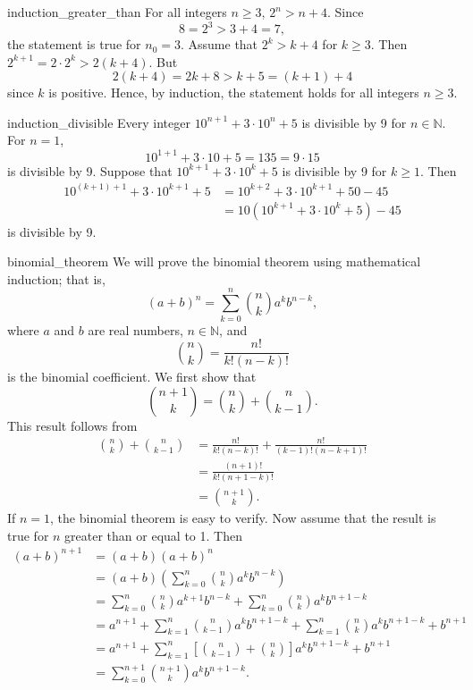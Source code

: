 
\begin{example}{induction_greater_than}
For all integers $n \geq 3$, $2^n > n + 4$. Since
\[
8 = 2^3 > 3 + 4 = 7,
\]
the statement is true for $n_0 = 3$.  Assume that $2^k > k + 4$ for $k \geq 3$.  Then $2^{k + 1} = 2 \cdot 2^{k} > 2(k + 4)$.  But 
\[
2(k + 4) = 2k + 8 > k + 5 = (k + 1) + 4
\]
since $k$ is positive.  Hence, by induction, the statement holds for all integers $n \geq 3$. 
\end{example}

\begin{example}{induction_divisible}
Every integer $10^{n + 1} + 3 \cdot 10^n + 5$ is divisible by 9 for $n \in {\mathbb N}$.  For $n = 1$, 
\[
10^{1 + 1} + 3 \cdot 10 + 5 = 135 = 9 \cdot 15
\]
is divisible by 9.  Suppose that $10^{k + 1} + 3 \cdot 10^k + 5$ is divisible by 9 for $k \geq 1$.  Then 
\begin{align*}
10^{(k + 1) + 1} + 3 \cdot 10^{k + 1} + 5
& =
10^{k + 2} + 3 \cdot 10^{k + 1} + 50 - 45 \\
& =
10 (10^{k + 1} + 3 \cdot 10^{k} + 5) - 45
\end{align*}
is divisible by 9.
\end{example}

\begin{example}{binomial_theorem}
We will prove the binomial theorem using mathematical induction; that is, 
\[
(a + b)^n = \sum_{k = 0}^{n} \binom{n}{k} a^k b^{n - k},
\]
where $a$ and $b$ are real numbers, $n \in \mathbb{N}$, and
\[
\binom{n}{k}
= \frac{n!}{k! (n - k)!}\label{factorial}
\]
is the binomial coefficient.\label{binomial}  We first show that
\[
\binom{n + 1}{k}
=
\binom{n}{k} + \binom{n}{k - 1}.
\]
This result follows from
\begin{align*}
\binom{n}{k} + \binom{n}{k - 1}
& =
\frac{n!}{k!(n - k)!}
+\frac{n!}{(k-1)!(n - k + 1)!} \\
& =
\frac{(n + 1)!}{k!(n + 1 - k)!} \\
& =
\binom{n + 1}{k}.
\end{align*}
If $n = 1$, the binomial theorem is easy to verify. Now assume that the result is true for $n$ greater than or equal to 1.  Then
\begin{align*}
(a + b)^{n + 1}
& = 
(a + b)(a + b)^n \\
& =
(a + b) 
\left(
\sum_{k = 0}^{n} \binom{n}{k} a^k b^{n - k}
\right) \\
& = 
\sum_{k = 0}^{n} \binom{n}{k} a^{k + 1} b^{n - k}   +
\sum_{k = 0}^{n} \binom{n}{k} a^k b^{n + 1 - k} \\
& = 
a^{n + 1} + \sum_{k = 1}^{n} \binom{n}{k - 1} a^{k} b^{n + 1 - k} 
 +
\sum_{k = 1}^{n} \binom{n}{k}  a^k b^{n + 1 - k} + b^{n + 1}\\
&  = 
a^{n + 1} + \sum_{k = 1}^{n} \left[ \binom{n}{k - 1}
+
\binom{n}{k} \right]
a^k b^{n + 1 - k} + b^{n + 1} \\
&  = 
\sum_{k = 0}^{n + 1}   \binom{n + 1}{k} a^k b^{n + 1- k}.
\end{align*}
\end{example}
 
